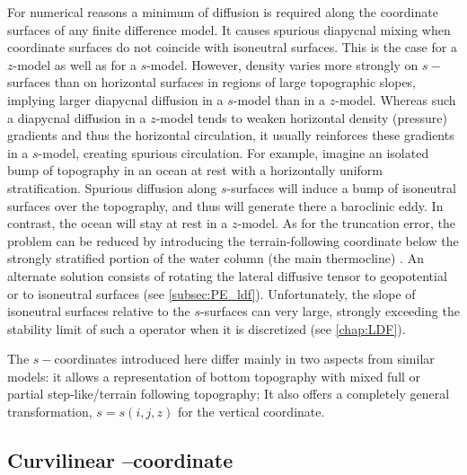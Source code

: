 \documentclass[../main/NEMO_manual]{subfiles}
\begin{document}
For numerical reasons a minimum of diffusion is required along the coordinate surfaces of any finite difference model.
It causes spurious diapycnal mixing when coordinate surfaces do not coincide with isoneutral surfaces.
This is the case for a $z$-model as well as for a $s$-model.
However, density varies more strongly on $s-$surfaces than on horizontal surfaces in regions of
large topographic slopes, implying larger diapycnal diffusion in a $s$-model than in a $z$-model.
Whereas such a diapycnal diffusion in a $z$-model tends to weaken horizontal density (pressure) gradients and thus
the horizontal circulation, it usually reinforces these gradients in a $s$-model, creating spurious circulation.
For example, imagine an isolated bump of topography in an ocean at rest with a horizontally uniform stratification.
Spurious diffusion along $s$-surfaces will induce a bump of isoneutral surfaces over the topography,
and thus will generate there a baroclinic eddy.
In contrast, the ocean will stay at rest in a $z$-model.
As for the truncation error, the problem can be reduced by introducing the terrain-following coordinate below
the strongly stratified portion of the water column (\ie the main thermocline) \citep{Madec_al_JPO96}.
An alternate solution consists of rotating the lateral diffusive tensor to geopotential or to isoneutral surfaces
(see \autoref{subsec:PE_ldf}).
Unfortunately, the slope of isoneutral surfaces relative to the $s$-surfaces can very large,
strongly exceeding the stability limit of such a operator when it is discretized (see \autoref{chap:LDF}). 

The $s-$coordinates introduced here \citep{Lott_al_OM90,Madec_al_JPO96} differ mainly in two aspects from
similar models:
it allows a representation of bottom topography with mixed full or partial step-like/terrain following topography;
It also offers a completely general transformation, $s=s(i,j,z)$ for the vertical coordinate.


\newpage

\subsection{\texorpdfstring{Curvilinear \ztilde--coordinate}{}}
\label{subsec:PE_zco_tilde}
\end{document}
